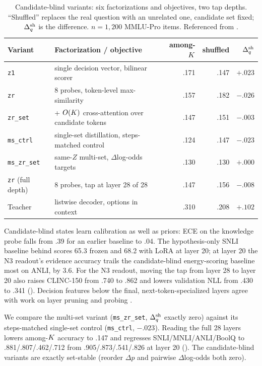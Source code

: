\begin{table}[h]
  \centering
  \caption{Candidate-blind variants: six factorizations and objectives, two tap depths. ``Shuffled''
  replaces the real question with an unrelated one, candidate set fixed; $\Delta_q^{\mathrm{sh}}$ is the difference.
  $n{=}1{,}200$ MMLU-Pro items. Referenced from .}
  \label{tab:blind}
  \small
  \begin{tabular}{llrrr}
    \toprule
    Variant & Factorization / objective & among-$K$ & shuffled & $\Delta_q^{\mathrm{sh}}$ \\
    \midrule
    \texttt{z1} & single decision vector, bilinear scorer & .171 & .147 & $+.023$ \\
    \texttt{zr} & 8 probes, token-level max-similarity & .157 & .182 & $-.026$ \\
    \texttt{zr\_set} & + $O(K)$ cross-attention over candidate tokens & .147 & .151 & $-.003$ \\
    \texttt{ms\_ctrl} & single-set distillation, steps-matched control & .124 & .147 & $-.023$ \\
    \texttt{ms\_zr\_set} & same-$Z$ multi-set, $\Delta$log-odds targets & .130 & .130 & $+.000$ \\
    \texttt{zr} (full depth) & 8 probes, tap at layer 28 of 28 & .147 & .156 & $-.008$ \\
    \midrule
    Teacher & listwise decoder, options in context & .310 & .208 & $\mathbf{+.102}$ \\
    \bottomrule
  \end{tabular}
\end{table}

Candidate-blind states learn calibration as well as priors: ECE on the knowledge probe falls from .39
for an earlier baseline to .04. The hypothesis-only SNLI baseline behind 
scores 65.3 frozen and 68.2 with LoRA at layer 20; at layer 20 the N3 readout's evidence accuracy trails
the candidate-blind energy-scoring baseline most on ANLI, by 3.6. For the N3 readout, moving the tap from layer 28 to layer 20 also raises CLINC-150 from .740 to .862
and lowers validation NLL from .430 to .341 (). Decision features below the
final, next-token-specialized layers agree with work on layer pruning and probing
\citep{gromov2024deeperlayers,men2024shortgpt,tenney2019pipeline,belrose2023tunedlens}.

We compare the multi-set variant (\texttt{ms\_zr\_set}, $\Delta_q^{\mathrm{sh}}$ exactly zero) against its steps-matched
single-set control (\texttt{ms\_ctrl}, $-.023$). Reading the full 28 layers lowers among-$K$
accuracy to .147 and regresses SNLI/MNLI/ANLI/BoolQ to .881/.807/.462/.712 from .905/.873/.541/.826 at
layer 20 (). The candidate-blind variants are exactly set-stable (reorder
$\Delta p$ and pairwise $\Delta$log-odds both zero).

